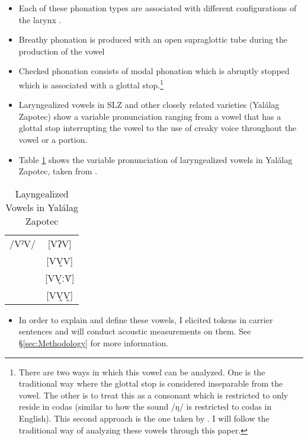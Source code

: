 \documentclass[12pt, letterpaper]{article}
\providecommand{\lsptoprule}{\midrule\toprule}
\providecommand{\lspbottomrule}{\bottomrule\midrule}
\begin{document}
\begin{itemize}
	\item Each of these phonation types are associated with different configurations of the larynx \citep{eslingVoiceQualityLaryngeal2019}.
	\item Breathy phonation is produced with an open supraglottic tube during the production of the vowel
	\item Checked phonation consists of modal phonation which is abruptly stopped which is associated with a glottal stop.\footnote{There are two ways in which this vowel can be analyzed. One is the traditional way where the glottal stop is considered inseparable from the vowel. The other is to treat this as a consonant which is restricted to only reside in codas (similar to how the sound /ŋ/ is restricted to codas in English). This second approach is the one taken by \citet{avelinobecerraTopicsYalalagZapotec2004}. I will follow the traditional way of analyzing these vowels through this paper.}
	\item Laryngealized vowels in SLZ and other closely related varieties (Yalálag Zapotec) show a variable pronunciation ranging from a vowel that has a glottal stop interrupting the vowel to the use of creaky voice throughout the vowel or a portion.  
	\item Table \ref{tab:laryngeal} shows the variable pronunciation of laryngealized vowels in Yalálag Zapotec, taken from \citet{avelinoAcousticElectroglottographicAnalyses2010}. 
	\end{itemize}

\begin{table}[!h]
\centering
\caption{Layngealized Vowels in Yalálag Zapotec}
\label{tab:laryngeal}
 \begin{tabular}{lc}
  \lsptoprule
	/VˀV/ &  [VʔV]  \\
	    	&  [VV̰V]   \\
	   		&  [VV̰ːV̆]  \\
	   		&  [VV̰V̰]	\\
  \lspbottomrule
 \end{tabular}
\end{table}

\begin{itemize}
	\item In order to explain and define these vowels, I elicited tokens in carrier sentences and will conduct acoustic measurements on them. See §\ref{sec:Methodology} for more information. 
\end{itemize}
\end{document}

